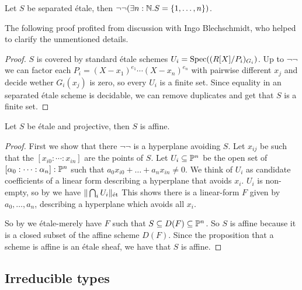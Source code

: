 \begin{proposition}
  Let \(S\) be separated étale, then \(\neg\neg(\exists n:\N. S=\{1,\dots,n\})\).
\end{proposition}

The following proof profited from discussion with Ingo Blechschmidt, who helped to clarify the unmentioned details.

\begin{proof}
  \(S\) is covered by standard étale schemes \(U_i=\Spec((R[X]/P_i)_{G_i})\).
  Up to \(\neg\neg\) we can factor each \(P_i=(X-x_1)^{e_1}\cdots(X-x_n)^{e_n}\) with pairwise different \(x_j\) and decide wether \(G_i(x_j)\) is zero, so every \(U_i\) is a finite set.
  Since equality in an separated étale scheme is decidable,
  we can remove duplicates and get that \(S\) is a finite set.
\end{proof}

\begin{theorem}
  Let \(S\) be étale and projective, then \(S\) is affine.
\end{theorem}

\begin{proof}
  First we show that there \(\neg\neg\) is a hyperplane avoiding \(S\).
  Let \(x_{ij}\) be such that the \([x_{i0}:\cdots:x_{in}]\) are the points of \(S\).
  Let \(U_i\subseteq \bP^n\) be the open set of \([\alpha_0:\dots:\alpha_n]:\bP^n\) such that \(a_0x_{i0}+\dots +a_nx_{in}\neq 0\).
  We think of \(U_i\) as candidate coefficients of a linear form describing a hyperplane that avoids \(x_i\).
  \(U_i\) is non-empty, so by 
  we have \(\|\bigcap_i U_i\|_\et\)
  This shows there is a linear-form \(F\) given by \(a_0,\dots,a_n\), describing a hyperplane which avoids all \(x_i\).

  So by  we étale-merely have \(F\) such that \(S\subseteq D(F)\subseteq \bP^n\).
  So \(S\) is affine because it is a closed subset of the affine scheme \(D(F)\). Since the proposition that a scheme is affine is an étale sheaf, we have that \(S\) is affine.
\end{proof}

\subsection{Irreducible types}


